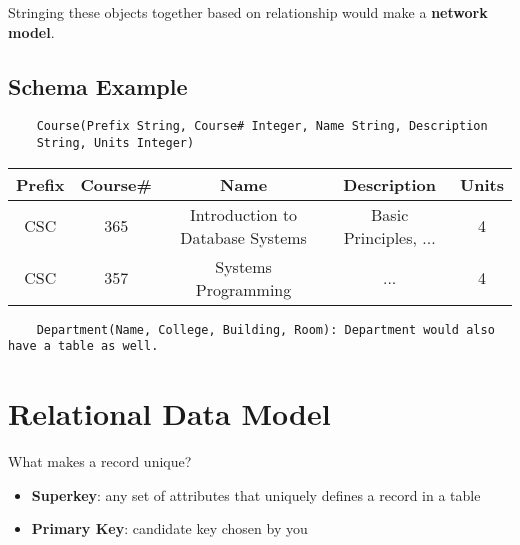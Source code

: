\documentclass[twoside]{article}
\begin{document}
Stringing these objects together based on relationship would 
make a \textbf{network model}.

\subsection*{Schema Example}
\begin{verbatim}
    Course(Prefix String, Course# Integer, Name String, Description
    String, Units Integer)
\end{verbatim}

\begin{table}[h]
    \centering
    \begin{tabular}{|c|c|c|c|c|}
        \hline
        Prefix & Course\# & Name & Description & Units \\
        \hline
        CSC & 365 & Introduction to Database Systems & Basic Principles, ... & 4 \\
        \hline
        CSC & 357 & Systems Programming & ... & 4 \\
        \hline
    \end{tabular}
\end{table}

\begin{verbatim}
    Department(Name, College, Building, Room): Department would also have a table as well.
\end{verbatim}

\newpage
\hfill \break 
{}

\section*{Relational Data Model}

What makes a record unique?
\begin{itemize}
    \item \textbf{Superkey}: any set of attributes that uniquely defines a record in a table
    \item \textbf{Primary Key}: candidate key chosen by you
\end{itemize}
\end{document}

